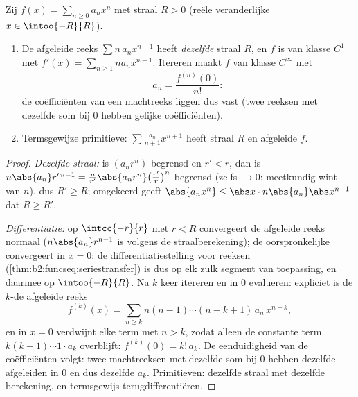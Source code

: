 \begin{theorem}\label{thm:b2:powerseries:calculus}
Zij $f(x) = \sum_{n\geq0} a_n x^n$ met straal $R > 0$ (reële
veranderlijke $x \in \intoo{-R}{R}$).
\begin{enumerate}
  \item De afgeleide reeks $\sum n\,a_n x^{n-1}$ heeft
        \emph{dezelfde} straal $R$, en $f$ is van klasse $C^1$ met
        $f'(x) = \sum_{n \geq 1} n a_n x^{n-1}$. Itereren maakt $f$
        van klasse $C^\infty$ met
        \[
        a_n = \frac{f^{(n)}(0)}{n!} :
        \]
        de coëfficiënten van een machtreeks liggen dus vast (twee
        reeksen met dezelfde som bij $0$ hebben gelijke
        coëfficiënten).
  \item Termsgewijze primitieve: $\sum \frac{a_n}{n+1}x^{n+1}$ heeft
        straal $R$ en afgeleide $f$.
\end{enumerate}
\end{theorem}

\begin{proof}
\emph{Dezelfde straal:} is $(a_nr^n)$ begrensd en $r' < r$, dan is
$n\abs{a_n} r'^{\,n-1} = \frac{n}{r'}\abs{a_nr^n}
\bigl(\frac{r'}{r}\bigr)^n$ begrensd (zelfs $\to 0$: meetkundig
wint van $n$), dus $R' \geq R$; omgekeerd geeft $\abs{a_n x^n} \leq
\abs x \cdot n\abs{a_n}\abs x^{n-1}$ dat $R \geq R'$.

\emph{Differentiatie:} op $\intcc{-r}{r}$ met $r < R$ convergeert
de afgeleide reeks normaal ($n\abs{a_n}r^{n-1}$ is 
volgens de straalberekening); de oorspronkelijke convergeert in $x
= 0$: de differentiatiestelling voor reeksen
(\cref{thm:b2:funcseq:seriestransfer}) is dus op elk zulk segment
van toepassing, en daarmee op $\intoo{-R}{R}$. Na $k$ keer
itereren en in $0$ evalueren: expliciet is de $k$-de afgeleide
reeks
\[
f^{(k)}(x) = \sum_{n\geq k} n(n-1)\cdots(n-k+1)\,a_n\,x^{n-k},
\]
en in $x = 0$ verdwijnt elke term met $n > k$, zodat alleen de
constante term $k(k-1)\cdots1\cdot a_k$ overblijft: $f^{(k)}(0) =
k!\,a_k$. De eenduidigheid van de coëfficiënten volgt: twee
machtreeksen met dezelfde som bij $0$ hebben dezelfde afgeleiden in
$0$ en dus dezelfde $a_k$. Primitieven: dezelfde straal met
dezelfde berekening, en termsgewijs terugdifferentiëren.
\end{proof}

